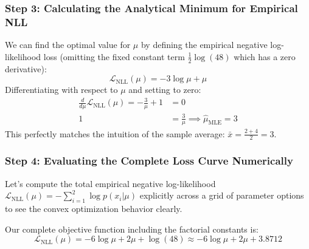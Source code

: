 \documentclass{article}
\begin{document}
\subsubsection{Step 3: Calculating the Analytical Minimum for Empirical NLL}
We can find the optimal value for $\mu$ by defining the empirical negative log-likelihood loss (omitting the fixed constant term $\frac{1}{2}\log(48)$ which has a zero derivative):
\begin{equation}
\mathcal{L}_{\text{NLL}}(\mu) = -3\log\mu + \mu
\end{equation}
Differentiating with respect to $\mu$ and setting to zero:
\begin{align*}
\frac{d}{d\mu}\mathcal{L}_{\text{NLL}}(\mu) = -\frac{3}{\mu} + 1 &= 0 \\
1 &= \frac{3}{\mu} \implies \hat{\mu}_{\text{MLE}} = 3
\end{align*}
This perfectly matches the intuition of the sample average: $\bar{x} = \frac{2+4}{2} = 3$.

\subsubsection{Step 4: Evaluating the Complete Loss Curve Numerically}

Let's compute the total empirical negative log-likelihood $\mathcal{L}_{\text{NLL}}(\mu) = -\sum_{i=1}^2 \log p(x_i|\mu)$ explicitly across a grid of parameter options to see the convex optimization behavior clearly.

Our complete objective function including the factorial constants is:
\begin{equation}
\mathcal{L}_{\text{NLL}}(\mu) = -6\log\mu + 2\mu + \log(48) \approx -6\log\mu + 2\mu + 3.8712
\end{equation}

\begin{table}[h!]
\centering
\small
{}
\caption{Numerical Evaluation of the Poisson NLL Loss Landscape}
\label{tab:loss_landscape}
\end{table}
\end{document}
